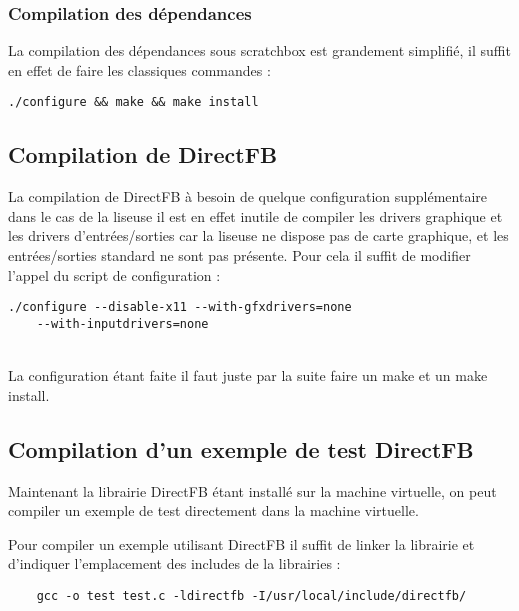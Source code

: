 \subsubsection{Compilation des dépendances}

La compilation des dépendances sous scratchbox est grandement simplifié, il suffit en effet de faire les classiques commandes : 
	\begin{lstlisting}
./configure && make && make install
	\end{lstlisting}

\subsection{Compilation de DirectFB}

La compilation de DirectFB à besoin de quelque configuration supplémentaire dans le cas de la liseuse il est en effet inutile de compiler les drivers graphique et les drivers d'entrées/sorties car la liseuse ne dispose pas de carte graphique, et les entrées/sorties standard ne sont pas présente.
Pour cela il suffit de modifier l'appel du script de configuration : 
\begin{lstlisting}
./configure --disable-x11 --with-gfxdrivers=none 
	--with-inputdrivers=none
\end{lstlisting}
~\\
La configuration étant faite il faut juste par la suite faire un make  et un make install.

\subsection{Compilation d'un exemple de test DirectFB}

Maintenant la librairie DirectFB étant installé sur la machine virtuelle, on peut compiler un exemple de test directement dans la machine virtuelle.

Pour compiler un exemple utilisant DirectFB il suffit de linker la librairie et d'indiquer l'emplacement des includes de la librairies : 
\begin{lstlisting}
	gcc -o test test.c -ldirectfb -I/usr/local/include/directfb/
\end{lstlisting}